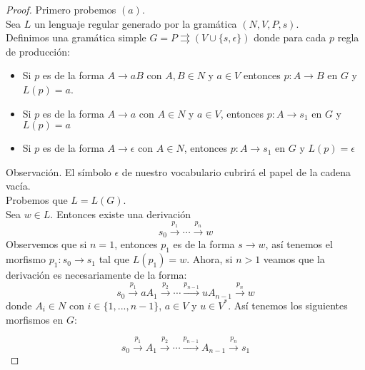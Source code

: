\documentclass[../main.tex]{subfiles}
\begin{document}
 \begin{proof}
 	
 	
 	Primero probemos $(a)$.\\
 	Sea $L$ un lenguaje regular generado por la gramática $(N,V,P,s)$. \\
 	Definimos una gramática simple $G=P \rightrightarrows (V \cup \{ s, \epsilon \})$ donde para cada $p$ regla de producción:
 	\begin{itemize}
 		\item Si $p$ es de la forma $A \to aB$ con $A,B \in N$ y $a \in V$ entonces $p:A \to B$ en $G$ y $L(p)=a$.
 		\item Si $p$ es de la forma $A \to a$ con $A \in N$ y $a \in V$, entonces $p:A \to s_1$ en $G$ y $L(p)=a$
 		\item Si $p$ es de la forma $A \to \epsilon$ con $A \in N$, entonces $p:A \to s_1$ en $G$ y $L(p)=\epsilon$
 	\end{itemize}
 	
 	Observación. El símbolo $\epsilon$ de nuestro vocabulario cubrirá el papel de la cadena vacía. \\
 	
 	Probemos que $L=L(G)$.\\
 	Sea $w \in L$. 
 	Entonces existe una derivación
 	\[ s_0 \xrightarrow{p_1} \cdots \xrightarrow{p_n} w\]
 	Observemos que si $n=1$, entonces $p_1$ es de la forma $s \to w$, así tenemos el morfismo $p_1: s_0 \to s_1$ tal que $L(p_1)=w$.
 	Ahora, si $n>1$ veamos que la derivación es necesariamente de la forma: 
 	\[ s_0 \xrightarrow{p_1} aA_1 \xrightarrow{p_2} \cdots \xrightarrow{p_{n-1}} uA_{n-1} \xrightarrow{p_n} w\]
 	donde $A_i \in N$ con $i \in \{ 1, ..., n-1 \}$, $a\in V$ y $u \in V^*$. Así tenemos los siguientes morfismos en $G$: 
 	
 	\[ s_0 \xrightarrow{p_1} A_1 \xrightarrow{p_2} \cdots \xrightarrow{p_{n-1}} A_{n-1} \xrightarrow{p_n} s_1\]
 	

\end{proof}
\end{document}
